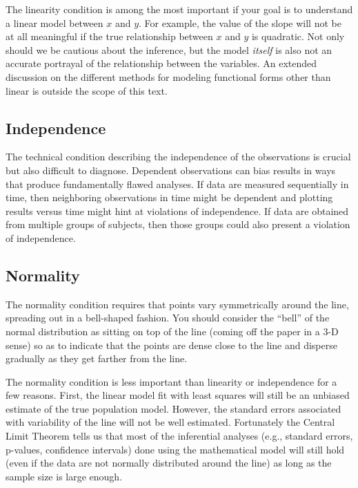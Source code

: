 \documentclass[
  10pt,
  openany]{book}
\theoremstyle{definition}
\theoremstyle{definition}
\theoremstyle{definition}
\theoremstyle{definition}
\theoremstyle{remark}
\begin{document}
The linearity condition is among the most important if your goal is to understand a linear model between \(x\) and \(y\).
For example, the value of the slope will not be at all meaningful if the true relationship between \(x\) and \(y\) is quadratic.
Not only should we be cautious about the inference, but the model \emph{itself} is also not an accurate portrayal of the relationship between the variables. An extended discussion on the different methods for modeling functional forms other than linear is outside the scope of this text.

\subsection{\texorpdfstring{\textbf{I}ndependence}{Independence}}\label{independence}

The technical condition describing the independence of the observations is crucial but also difficult to diagnose. Dependent observations can bias results in ways that produce fundamentally flawed analyses. If data are measured sequentially in time, then neighboring observations in time might be dependent and plotting results versus time might hint at violations of independence. If data are obtained from multiple groups of subjects, then those groups could also present a violation of independence.

\subsection{\texorpdfstring{\textbf{N}ormality}{Normality}}\label{normality}

The normality condition requires that points vary symmetrically around the line, spreading out in a bell-shaped fashion. You should consider the ``bell'' of the normal distribution as sitting on top of the line (coming off the paper in a 3-D sense) so as to indicate that the points are dense close to the line and disperse gradually as they get farther from the line.

The normality condition is less important than linearity or independence for a few reasons.
First, the linear model fit with least squares will still be an unbiased estimate of the true population model.
However, the standard errors associated with variability of the line will not be well estimated.
Fortunately the Central Limit Theorem tells us that most of the inferential analyses (e.g., standard errors, p-values, confidence intervals) done using the mathematical model will still hold (even if the data are not normally distributed around the line) as long as the sample size is large enough.
\end{document}
